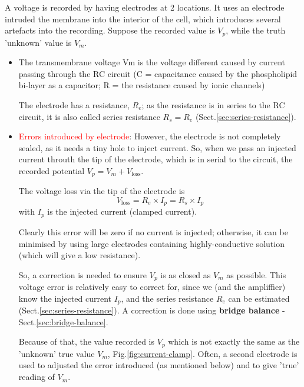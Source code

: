 A voltage is recorded by having electrodes at 2 locations.
It uses an electrode intruded the membrane into the interior of the cell, which
introduces several artefacts into the recording. Suppose the recorded value is
$V_p$, while the truth 'unknown' value is $V_m$.
\begin{itemize}

  \item  The transmembrane voltage Vm is the voltage different caused by current
  passing through the RC circuit (C = capacitance caused by the phospholipid
  bi-layer as a capacitor; R = the resistance caused by ionic channels)

The electrode has a resistance, $R_e$; as the resistance is in series to the RC
circuit, it is also called series resistance $R_s = R_e$
(Sect.\ref{sec:series-resistance}).

  \item \textcolor{red}{Errors introduced by electrode}:
  However, the electrode is not completely sealed, as it
  needs a tiny hole to inject current.  So, when we pass an injected
  current throuth the tip of the electrode, which is in serial to the circuit,
  the recorded potential  $V_p = V_m + V_\text{loss}$.


The voltage loss via the tip of the electrode
is 
\begin{equation}
V_\text{loss} = R_e \times I_p  = R_s \times I_p
\end{equation}
with $I_p$ is the injected current
(clamped current).

Clearly this error will be zero if no current is injected; otherwise, it can be
minimised by using large electrodes containing highly-conductive solution (which
will give a low resistance).

So, a correction is needed to ensure $V_p$ is as closed as $V_m$ as possible.
This voltage error is relatively easy to correct for, since we (and
the ampliffier) know the injected current $I_p$, and the series resistance
$R_e$ can be estimated (Sect.\ref{sec:series-resistance}). A correction is done
using {\bf bridge balance} - Sect.\ref{sec:bridge-balance}.


Because of that, the value recorded is $V_p$ which is not exactly the same as
the 'unknown' true value $V_m$, Fig.\ref{fig:current-clamp}. Often, a second
electrode is used to adjusted the error introduced (as mentioned below) and to
give 'true' reading of $V_m$.


\end{itemize}
